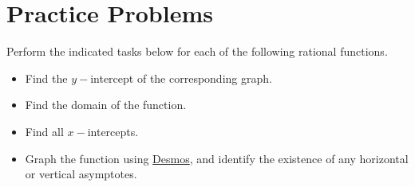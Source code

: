 \documentclass[12pt]{book}
\theoremstyle{definition}
\newcommand{\Desmos}{\href{https://www.desmos.com/}{Desmos}}
\begin{document}
\section{Practice Problems}
Perform the indicated tasks below for each of the following rational functions.
		\begin{itemize}
			\item Find the $y-$intercept of the corresponding graph.
			\item Find the domain of the function.
			\item Find all $x-$intercepts.
			\item Graph the function using \Desmos, and identify the existence of any horizontal or vertical asymptotes.
		\end{itemize}
\end{document}
